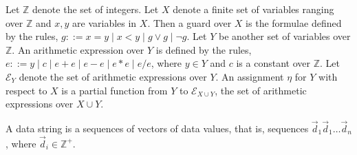 \documentclass[runningheads,a4paper]{llncs}
\def\Ee{{\mathcal{E} }}
\def\Ii{{\mathbb{Z} }}
\begin{document}
Let $\Ii$ denote the set of integers. Let $X$ denote a finite set of variables ranging over $\Ii$ and $x,y$ are variables in $X$. Then a guard over $X$ is the formulae defined by the rules, $g::= x = y \mid x < y \mid g \vee g \mid \neg g$. Let $Y$ be another set of variables over $\Ii$. An arithmetic expression over $Y$ is defined by the rules, $e::= y \mid c \mid e + e \mid e-e \mid e * e \mid e / e$, where $y \in Y$ and $c$ is a constant over $\Ii$. Let $\Ee_Y$ denote the set of arithmetic expressions over $Y$. An assignment $\eta$ for $Y$ with respect to $X$ is a partial function from $Y$ to $\Ee_{X \cup Y}$, the set of arithmetic expressions over $X \cup Y$.

A data string is a sequences of vectors of data values, that is, sequences $\vec{d}_1\vec{d}_1\dots \vec{d}_n$, where $\vec{d}_i \in \Ii^+$.
\end{document}
